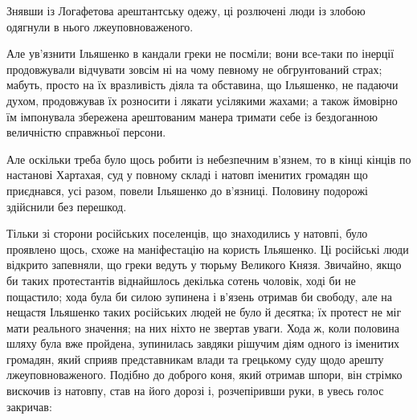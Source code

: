\documentclass[a4paper,20pt]{report}
\begin{document}

Знявши із Логафетова арештантську одежу, ці розлючені люди із злобою одягнули в нього
лжеуповноваженого.

Але ув'язнити Ільяшенко в кандали греки не посміли; вони все-таки по інерції
продовжували відчувати зовсім ні на чому певному не обгрунтований страх; мабуть,
просто на їх вразливість діяла та обставина, що Ільяшенко, не падаючи духом, продовжував
їх розносити і лякати усілякими жахами; а також ймовірно їм імпонувала збережена арештованим манера тримати
себе із бездоганною величністю справжньої персони.

Але оскільки треба було щось робити із небезпечним в'язнем, то в кінці кінців
по настанові Хартахая, суд у повному складі і натовп іменитих громадян що
приєднався, усі разом, повели Ільяшенко до в'язниці. Половину подорожі
здійснили без перешкод.

Тільки зі сторони російських поселенців, що знаходились у натовпі, було
проявлено щось, схоже на маніфестацію на користь Ільяшенко. Ці російські люди
відкрито запевняли, що греки ведуть у тюрьму Великого Князя. Звичайно, якщо би
таких протестантів віднайшлось декілька сотень чоловік, ході би не пощастило;
хода була би силою зупинена і в'язень отримав би свободу, але на нещастя
Ільяшенко таких російських людей не було й десятка; їх протест не міг мати
реального значення; на них ніхто не звертав уваги. Хода ж, коли половина шляху
була вже пройдена, зупинилась завдяки рішучим діям одного із іменитих громадян,
який сприяв представникам влади та грецькому суду щодо арешту
лжеуповноваженого. Подібно до доброго коня, який отримав шпори, він стрімко
вискочив із натовпу, став на його дорозі і, розчепіривши руки, в увесь голос
закричав:
\end{document}
